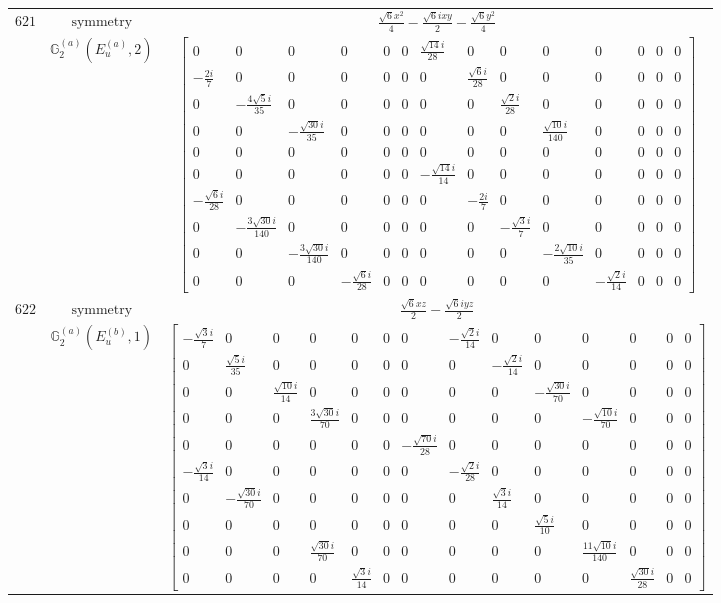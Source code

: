 \documentclass[fleqn,8pt,landscape]{jsarticle}
\begin{document}
\begin{longtable}{ccc}
$ 621 $ & $ \text{symmetry} $ & $ \frac{\sqrt{6} x^{2}}{4} - \frac{\sqrt{6} i x y}{2} - \frac{\sqrt{6} y^{2}}{4} $ \\
$  $ & $ \mathbb{G}_{2}^{(a)}(E_{u}^{(a)},2) $ & $ \begin{bmatrix} 0 & 0 & 0 & 0 & 0 & 0 & \frac{\sqrt{14} i}{28} & 0 & 0 & 0 & 0 & 0 & 0 & 0 \\ - \frac{2 i}{7} & 0 & 0 & 0 & 0 & 0 & 0 & \frac{\sqrt{6} i}{28} & 0 & 0 & 0 & 0 & 0 & 0 \\ 0 & - \frac{4 \sqrt{5} i}{35} & 0 & 0 & 0 & 0 & 0 & 0 & \frac{\sqrt{2} i}{28} & 0 & 0 & 0 & 0 & 0 \\ 0 & 0 & - \frac{\sqrt{30} i}{35} & 0 & 0 & 0 & 0 & 0 & 0 & \frac{\sqrt{10} i}{140} & 0 & 0 & 0 & 0 \\ 0 & 0 & 0 & 0 & 0 & 0 & 0 & 0 & 0 & 0 & 0 & 0 & 0 & 0 \\ 0 & 0 & 0 & 0 & 0 & 0 & - \frac{\sqrt{14} i}{14} & 0 & 0 & 0 & 0 & 0 & 0 & 0 \\ - \frac{\sqrt{6} i}{28} & 0 & 0 & 0 & 0 & 0 & 0 & - \frac{2 i}{7} & 0 & 0 & 0 & 0 & 0 & 0 \\ 0 & - \frac{3 \sqrt{30} i}{140} & 0 & 0 & 0 & 0 & 0 & 0 & - \frac{\sqrt{3} i}{7} & 0 & 0 & 0 & 0 & 0 \\ 0 & 0 & - \frac{3 \sqrt{30} i}{140} & 0 & 0 & 0 & 0 & 0 & 0 & - \frac{2 \sqrt{10} i}{35} & 0 & 0 & 0 & 0 \\ 0 & 0 & 0 & - \frac{\sqrt{6} i}{28} & 0 & 0 & 0 & 0 & 0 & 0 & - \frac{\sqrt{2} i}{14} & 0 & 0 & 0 \end{bmatrix} $ \\ \hline
$ 622 $ & $ \text{symmetry} $ & $ \frac{\sqrt{6} x z}{2} - \frac{\sqrt{6} i y z}{2} $ \\
$  $ & $ \mathbb{G}_{2}^{(a)}(E_{u}^{(b)},1) $ & $ \begin{bmatrix} - \frac{\sqrt{3} i}{7} & 0 & 0 & 0 & 0 & 0 & 0 & - \frac{\sqrt{2} i}{14} & 0 & 0 & 0 & 0 & 0 & 0 \\ 0 & \frac{\sqrt{5} i}{35} & 0 & 0 & 0 & 0 & 0 & 0 & - \frac{\sqrt{2} i}{14} & 0 & 0 & 0 & 0 & 0 \\ 0 & 0 & \frac{\sqrt{10} i}{14} & 0 & 0 & 0 & 0 & 0 & 0 & - \frac{\sqrt{30} i}{70} & 0 & 0 & 0 & 0 \\ 0 & 0 & 0 & \frac{3 \sqrt{30} i}{70} & 0 & 0 & 0 & 0 & 0 & 0 & - \frac{\sqrt{10} i}{70} & 0 & 0 & 0 \\ 0 & 0 & 0 & 0 & 0 & 0 & - \frac{\sqrt{70} i}{28} & 0 & 0 & 0 & 0 & 0 & 0 & 0 \\ - \frac{\sqrt{3} i}{14} & 0 & 0 & 0 & 0 & 0 & 0 & - \frac{\sqrt{2} i}{28} & 0 & 0 & 0 & 0 & 0 & 0 \\ 0 & - \frac{\sqrt{30} i}{70} & 0 & 0 & 0 & 0 & 0 & 0 & \frac{\sqrt{3} i}{14} & 0 & 0 & 0 & 0 & 0 \\ 0 & 0 & 0 & 0 & 0 & 0 & 0 & 0 & 0 & \frac{\sqrt{5} i}{10} & 0 & 0 & 0 & 0 \\ 0 & 0 & 0 & \frac{\sqrt{30} i}{70} & 0 & 0 & 0 & 0 & 0 & 0 & \frac{11 \sqrt{10} i}{140} & 0 & 0 & 0 \\ 0 & 0 & 0 & 0 & \frac{\sqrt{3} i}{14} & 0 & 0 & 0 & 0 & 0 & 0 & \frac{\sqrt{30} i}{28} & 0 & 0 \end{bmatrix} $ \\ \hline

\end{longtable}
\end{document}

